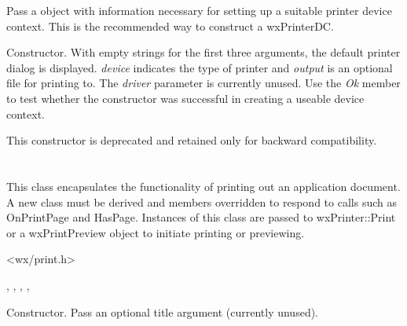 Pass a  object with information
necessary for setting up a suitable printer device context. This
is the recommended way to construct a wxPrinterDC.


Constructor. With empty strings for the first three arguments, the default printer dialog is
displayed. {\it device} indicates the type of printer and {\it output}
is an optional file for printing to. The {\it driver} parameter is
currently unused.  Use the {\it Ok} member to test whether the
constructor was successful in creating a useable device context.

This constructor is deprecated and retained only for backward compatibility.

\section{}\label{wxprintout}

This class encapsulates the functionality of printing out an
application document. A new class must be derived and members
overridden to respond to calls such as OnPrintPage and HasPage.
Instances of this class are passed to wxPrinter::Print or a
wxPrintPreview object to initiate printing or previewing.




<wx/print.h>


, , ,\rtfsp
{}, 




Constructor. Pass an optional title argument (currently unused).


